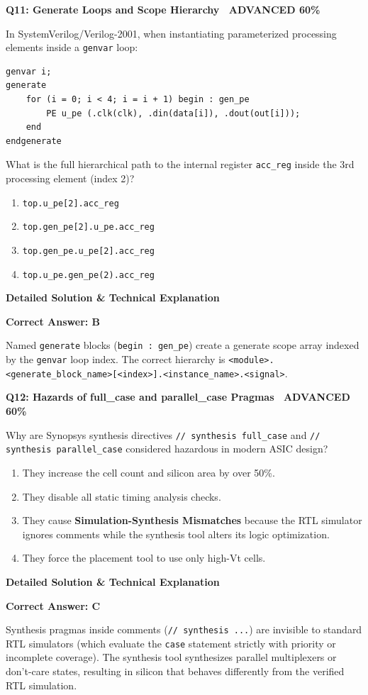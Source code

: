 \documentclass[11pt,a4paper]{article}
\newcommand{\badgeadv}{{\color{white}\colorbox{advred}{\bfseries\sffamily\tiny\ ADVANCED 60\%\ }}}
\newenvironment{qbox}[2]{%
  \begin{mdframed}[style=qstyle]%
  {\bfseries\sffamily\color{primaryblue}#1 \hfill #2}\par\vspace{2pt}%
}{%
  \end{mdframed}%
}
\newenvironment{ansbox}{%
  \begin{mdframed}[style=ansstyle]%
  {\bfseries\sffamily\color{ansgreen}\small Detailed Solution \& Technical Explanation}\par\vspace{2pt}\small%
}{%
  \end{mdframed}%
}
\begin{document}
\begin{qbox}{Q11: Generate Loops and Scope Hierarchy}{\badgeadv}
In SystemVerilog/Verilog-2001, when instantiating parameterized processing elements inside a \texttt{genvar} loop:
\begin{lstlisting}[style=verilogstyle]
genvar i;
generate
    for (i = 0; i < 4; i = i + 1) begin : gen_pe
        PE u_pe (.clk(clk), .din(data[i]), .dout(out[i]));
    end
endgenerate
\end{lstlisting}
What is the full hierarchical path to the internal register \texttt{acc\_reg} inside the 3rd processing element (index 2)?
\begin{enumerate}[label=\textbf{\Alph*.}]
  \item \texttt{top.u\_pe[2].acc\_reg}
  \item \texttt{top.gen\_pe[2].u\_pe.acc\_reg}
  \item \texttt{top.gen\_pe.u\_pe[2].acc\_reg}
  \item \texttt{top.u\_pe.gen\_pe(2).acc\_reg}
\end{enumerate}
\end{qbox}
\begin{ansbox}
\textbf{Correct Answer: B}

Named \texttt{generate} blocks (\texttt{begin : gen\_pe}) create a generate scope array indexed by the \texttt{genvar} loop index. The correct hierarchy is \texttt{<module>.<generate\_block\_name>[<index>].<instance\_name>.<signal>}.
\end{ansbox}

\begin{qbox}{Q12: Hazards of full\_case and parallel\_case Pragmas}{\badgeadv}
Why are Synopsys synthesis directives \texttt{// synthesis full\_case} and \texttt{// synthesis parallel\_case} considered hazardous in modern ASIC design?
\begin{enumerate}[label=\textbf{\Alph*.}]
  \item They increase the cell count and silicon area by over 50\%.
  \item They disable all static timing analysis checks.
  \item They cause \textbf{Simulation-Synthesis Mismatches} because the RTL simulator ignores comments while the synthesis tool alters its logic optimization.
  \item They force the placement tool to use only high-Vt cells.
\end{enumerate}
\end{qbox}
\begin{ansbox}
\textbf{Correct Answer: C}

Synthesis pragmas inside comments (\texttt{// synthesis ...}) are invisible to standard RTL simulators (which evaluate the \texttt{case} statement strictly with priority or incomplete coverage). The synthesis tool synthesizes parallel multiplexers or don't-care states, resulting in silicon that behaves differently from the verified RTL simulation.
\end{ansbox}
\end{document}
